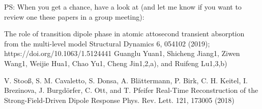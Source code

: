 
PS: When you get a chance, have a look at (and let me know if you want to review one these papers in a group meeting):

The role of transition dipole phase in atomic attosecond transient absorption from the multi-level model 
Structural Dynamics 6, 054102 (2019); https://doi.org/10.1063/1.5124441 
Guanglu Yuan1, Shicheng Jiang1, Ziwen Wang1,  Weijie Hua1, Chao Yu1,  Cheng Jin1,2,a), and  Ruifeng Lu1,3,b)

V. Stooß, S. M. Cavaletto, S. Donsa, A. Blättermann, P. Birk, C. H. Keitel, I. Brezinova, J. Burgdörfer, C. Ott, and T. Pfeifer
Real-Time Reconstruction of the Strong-Field-Driven Dipole Response
Phys. Rev. Lett. 121, 173005 (2018)
